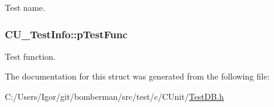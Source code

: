 Test name. 

\hypertarget{struct_c_u___test_info_a8b01dd299cfa2ba6b972fea808e7b007}{
\subsubsection[{p\+Test\+Func}]{ C\+U\+\_\+\+Test\+Info\+::p\+Test\+Func}}\label{struct_c_u___test_info_a8b01dd299cfa2ba6b972fea808e7b007}


Test function. 



The documentation for this struct was generated from the following file\+:\begin{DoxyCompactItemize}
\item 
C\+:/\+Users/\+Igor/git/bomberman/src/test/c/\+C\+Unit/\hyperlink{_test_d_b_8h}{Test\+D\+B.\+h}\end{DoxyCompactItemize}

